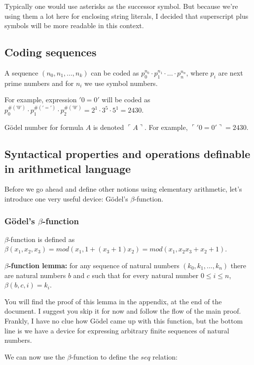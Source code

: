 \documentclass{article}
\begin{document}
Typically one would use asterisks as the successor symbol. But because we're using them
a lot here for enclosing string literals, I decided that superscript plus symbols will be
more readable in this context.

\subsection{Coding sequences}

A sequence $(n_0, n_1, ..., n_k)$ can be coded as $p_0^{n_0} \cdot p_1^{n_1} \cdot ... \cdot p_n^{n_n}$,
where $p_i$ are next prime numbers and for $n_i$ we use symbol numbers.

For example, expression $'0=0'$ will be coded as
$p_0^{\#('0')} \cdot p_1^{\#('=')} \cdot p_2^{\#('0')} = 2^1 \cdot 3^5 \cdot 5^1 = 2430$.

Gödel number for formula $A$ is denoted $\ulcorner A \urcorner$.
For example, $\ulcorner '0=0' \urcorner = 2430$.

\subsection{Syntactical properties and operations definable in arithmetical language}

Before we go ahead and define other notions using elementary arithmetic, let's introduce
one very useful device: Gödel's $\beta$-function.

\subsubsection{Gödel's $\beta$-function}

$\beta$-function is defined as $\beta(x_1, x_2, x_3) = mod(x_1, 1+(x_3+1)x_2) = 
mod(x_1, x_2x_3+x_2+1)$.

\textbf{$\beta$-function lemma:} for any sequence of natural numbers $(k_0, k_1, ..., k_n)$
there are natural numbers $b$ and $c$ such that for every natural number $0 \leqslant i \leqslant n$,
$\beta(b, c, i) = k_i$.

You will find the proof of this lemma in the appendix, at the end of the document. I suggest you skip it
for now and follow the flow of the main proof. Frankly, I have no clue how Gödel came up with this
function, but the bottom line is we have a device for expressing arbitrary finite sequences of natural
numbers.

We can now use the $\beta$-function to define the $seq$ relation:
\end{document}
